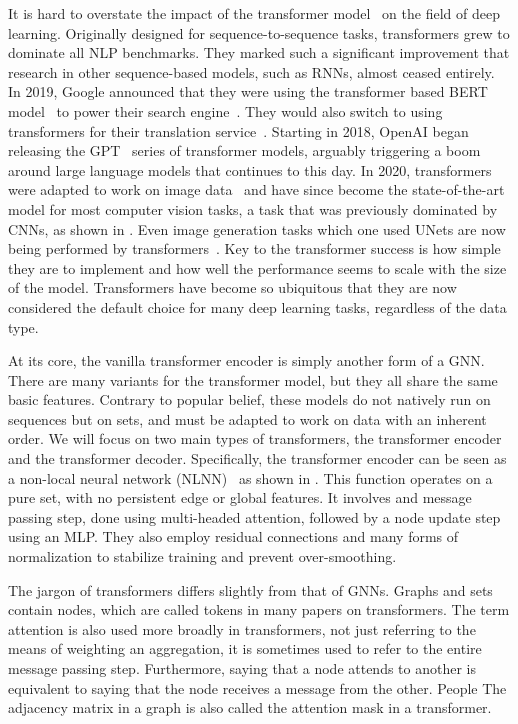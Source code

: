 It is hard to overstate the impact of the transformer model~ on the field of deep learning.
Originally designed for sequence-to-sequence tasks, transformers grew to dominate all NLP benchmarks.
They marked such a significant improvement that research in other sequence-based models, such as RNNs, almost ceased entirely.
In 2019, Google announced that they were using the transformer based BERT model~ to power their search engine~.
They would also switch to using transformers for their translation service~.
Starting in 2018, OpenAI began releasing the GPT~ series of transformer models, arguably triggering a boom around large language models that continues to this day.
In 2020, transformers were adapted to work on image data~ and have since become the state-of-the-art model for most computer vision tasks, a task that was previously dominated by CNNs, as shown in .
Even image generation tasks which one used UNets are now being performed by transformers~.
Key to the transformer success is how simple they are to implement and how well the performance seems to scale with the size of the model.
Transformers have become so ubiquitous that they are now considered the default choice for many deep learning tasks, regardless of the data type.

At its core, the vanilla transformer encoder is simply another form of a GNN\@.
There are many variants for the transformer model, but they all share the same basic features.
Contrary to popular belief, these models do not natively run on sequences but on sets, and must be adapted to work on data with an inherent order.
We will focus on two main types of transformers, the transformer encoder and the transformer decoder.
Specifically, the transformer encoder can be seen as a non-local neural network (NLNN)~ as shown in .
This function operates on a pure set, with no persistent edge or global features.
It involves and message passing step, done using multi-headed attention, followed by a node update step using an MLP.
They also employ residual connections and many forms of normalization to stabilize training and prevent over-smoothing.

The jargon of transformers differs slightly from that of GNNs.
Graphs and sets contain nodes, which are called tokens in many papers on transformers.
The term attention is also used more broadly in transformers, not just referring to the means of weighting an aggregation, it is sometimes used to refer to the entire message passing step.
Furthermore, saying that a node attends to another is equivalent to saying that the node receives a message from the other.
People
The adjacency matrix in a graph is also called the attention mask in a transformer.

